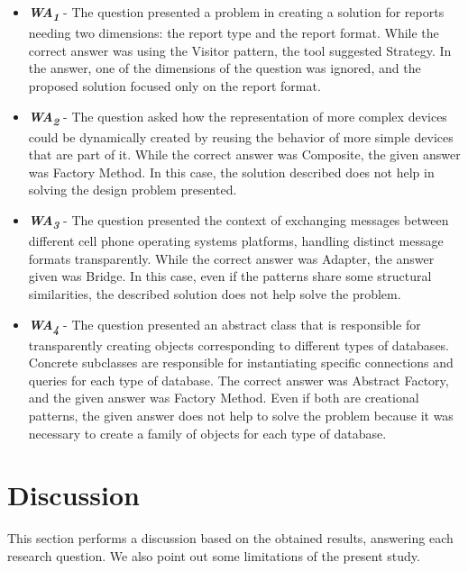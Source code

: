 \begin{itemize}
    \item  \textbf{\textit{WA\textsubscript{1}}} - The question presented a problem in creating a solution for reports needing two dimensions: the report type and the report format. While the correct answer was using the Visitor pattern, the tool suggested Strategy. In the answer, one of the dimensions of the question was ignored, and the proposed solution focused only on the report format.
    \item \textbf{\textit{WA\textsubscript{2}}} - The question asked how the representation of more complex devices could be dynamically created by reusing the behavior of more simple devices that are part of it. While the correct answer was Composite, the given answer was Factory Method. In this case, the solution described does not help in solving the design problem presented.
    \item \textbf{\textit{WA\textsubscript{3}}} - The question presented the context of exchanging messages between different cell phone operating systems platforms, handling distinct message formats transparently. While the correct answer was Adapter, the answer given was Bridge. In this case, even if the patterns share some structural similarities, the described solution does not help solve the problem.
    \item \textbf{\textit{WA\textsubscript{4}}} - The question presented an abstract class that is responsible for transparently creating objects corresponding to different types of databases. Concrete subclasses are responsible for instantiating specific connections and queries for each type of database. The correct answer was Abstract Factory, and the given answer was Factory Method. Even if both are creational patterns, the given answer does not help to solve the problem because it was necessary to create a family of objects for each type of database.
\end{itemize}

\section{Discussion}\label{DiscussionPreliminaryStudy}

This section performs a discussion based on the obtained results, answering each research question. We also point out some limitations of the present study.

